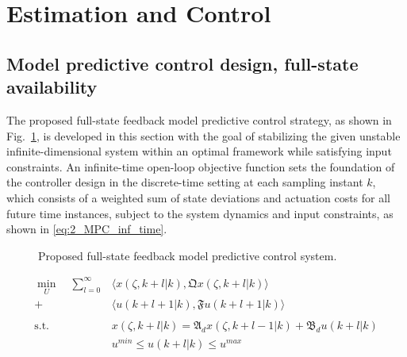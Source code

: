 \section{Estimation and Control}

\subsection{Model predictive control design, full-state availability}

The proposed full-state feedback model predictive control strategy, as shown in Fig.~\ref{fig:2_block_diagram}, is developed in this section with the goal of stabilizing the given unstable infinite-dimensional system within an optimal framework while satisfying input constraints. An infinite-time open-loop objective function sets the foundation of the controller design in the discrete-time setting at each sampling instant $k$, which consists of a weighted sum of state deviations and actuation costs for all future time instances, subject to the system dynamics and input constraints, as shown in \eqref{eq:2_MPC_inf_time}.

\begin{figure}[!htbp]
    \centering
    \caption{Proposed full-state feedback model predictive control system.}
    \label{fig:2_block_diagram}
\end{figure}

\begin{equation} \label{eq:2_MPC_inf_time}
    \begin{aligned}
        \min_{U} \quad \sum_{l=0}^{\infty} &\langle {x}(\zeta, k+l | k), \mathfrak{Q} {x}(\zeta, k+l | k) \rangle \\
        + &\langle u(k+l+1 | k), \mathfrak{F} u(k+l+1|k) \rangle \\
        \, \\
        \text{s.t.} \quad &{x}(\zeta, k+l | k) = \mathfrak{A}_d {x}(\zeta, k+l-1 | k) + \mathfrak{B}_d u(k+l | k) \\
        &u^{min} \leq u(k+l | k) \leq u^{max}
    \end{aligned}
\end{equation}

